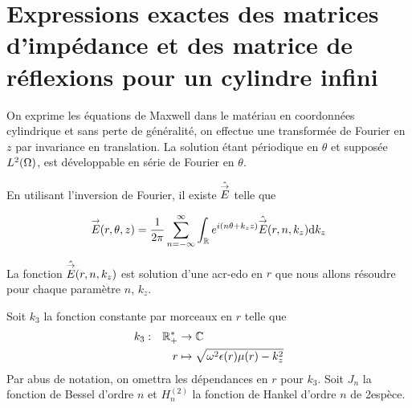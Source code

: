 \section{Expressions exactes des matrices d'impédance et des matrice de réflexions pour un cylindre infini}


  \begin{figure}[!hbt]
    \centering
    \begin{tikzpicture}
      
    \end{tikzpicture}
  \end{figure}

  On exprime les équations de Maxwell dans le matériau en coordonnées cylindrique et sans perte de généralité, on effectue une transformée de Fourier en \(z\) par invariance en translation.
  La solution étant périodique en \(\theta\) et supposée \(L^2(\OO)\), est développable en série de Fourier en \(\theta\).

  En utilisant l'inversion de Fourier, il existe \(\hat\vE\) telle que

  \begin{equation}
    \vE(r,\theta,z) = \frac{1}{2\pi}\sum_{n=-\infty}^{\infty}\int_{\RR} e^{i(n \theta + k_z z )}\hat{\vE} (r,n,k_z) \dd{k_z}
  \end{equation}

  La fonction \(\hat{\vE} (r,n,k_z)\) est solution d'une \gls{acr-edo} en \(r\) que nous allons résoudre pour chaque paramètre \(n\), \(k_z\).

  \begin{defn}
    Soit \(k_3\) la fonction constante par morceaux en \(r\) telle que
    \begin{equation}
      \fonction{k_3}{\RR_+^*}{\CC}
      {r}{\sqrt{\w^2\eps(r)\mu(r) - k_z^2}}
    \end{equation}
    Par abus de notation, on omettra les dépendances en \(r\) pour \(k_3\).
    Soit \(J_n\) la fonction de Bessel d'ordre \(n\) et \(H_n^{(2)}\) la fonction de Hankel d'ordre \(n\) de 2\ieme espèce.
  \end{defn}

